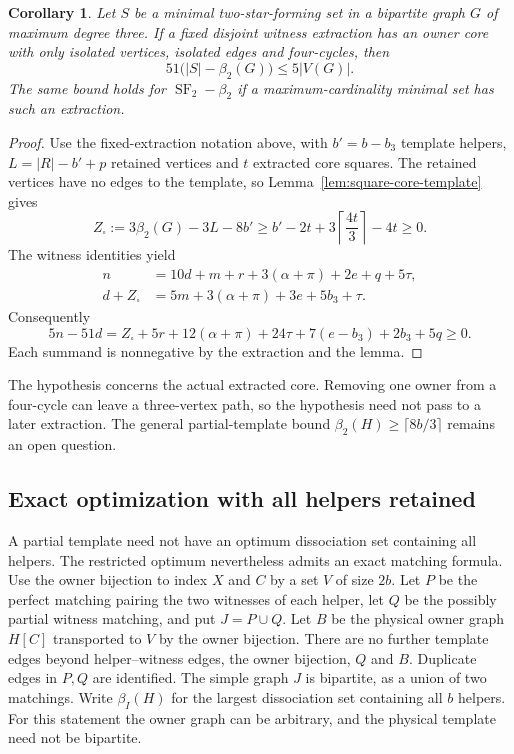\documentclass[11pt]{article}
\newtheorem{corollary}[theorem]{Corollary}
\newcommand{\SF}{\operatorname{SF}_2}
\newcommand{\diss}{\beta_2}
\begin{document}
\begin{corollary}\label{cor:square-core-gap}
Let $S$ be a minimal two-star-forming set in a bipartite graph $G$ of
maximum degree three. If a fixed disjoint witness extraction has an owner
core with only isolated vertices, isolated edges and four-cycles, then
\[
 51\bigl(|S|-\diss(G)\bigr)\le5|V(G)|.
\]
The same bound holds for $\SF-\diss$ if a maximum-cardinality minimal set
has such an extraction.
\end{corollary}
\begin{proof}
Use the fixed-extraction notation above, with $b'=b-b_3$ template helpers,
$L=|R|-b'+p$ retained vertices and $t$ extracted core squares. The retained
vertices have no edges to the template, so Lemma~\ref{lem:square-core-template}
gives
\[
 Z_\square:=3\diss(G)-3L-8b'
 \ge b'-2t+3\left\lceil\frac{4t}{3}\right\rceil-4t\ge0.
\]
The witness identities yield
\begin{align*}
 n&=10d+m+r+3(\alpha+\pi)+2e+q+5\tau,\\
 d+Z_\square&=5m+3(\alpha+\pi)+3e+5b_3+\tau.
\end{align*}
Consequently
\[
 5n-51d=Z_\square+5r+12(\alpha+\pi)+24\tau
                   +7(e-b_3)+2b_3+5q\ge0.
\]
Each summand is nonnegative by the extraction and the lemma.
\end{proof}

The hypothesis concerns the actual extracted core. Removing one owner from
a four-cycle can leave a three-vertex path, so the hypothesis need not pass
to a later extraction. The general partial-template bound
$\diss(H)\ge\lceil8b/3\rceil$ remains an open question.

\subsection{Exact optimization with all helpers retained}

A partial template need not have an optimum dissociation set containing all
helpers. The restricted optimum nevertheless admits an exact matching formula.
Use the owner bijection to index $X$ and $C$ by a set $V$ of size $2b$.
Let $P$ be the perfect matching pairing the two witnesses of each helper,
let $Q$ be the possibly partial witness matching, and put $J=P\cup Q$.
Let $B$ be the physical owner graph $H[C]$ transported to $V$ by the owner
bijection. There are no further template edges beyond helper--witness edges,
the owner bijection, $Q$ and $B$.
Duplicate edges in $P,Q$ are identified. The simple graph $J$ is bipartite,
as a union of two matchings. Write $\beta_I(H)$ for the largest dissociation
set containing all $b$ helpers. For this statement the owner graph can be
arbitrary, and the physical template need not be bipartite.
\end{document}
